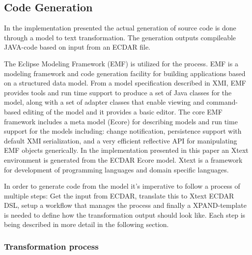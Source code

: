 \subsection{Code Generation}
\label{implementation-code-generation}

In the implementation presented the actual generation of source code is done
through a model to text transformation. The generation outputs compileable
JAVA-code based on input from an ECDAR file.

The Eclipse Modeling Framework (EMF) is utilized for the process. EMF is a
modeling framework and code generation facility for building applications based
on a structured data model. From a model specification described in XMI, EMF
provides tools and run time support to produce a set of Java classes for the
model, along with a set of adapter classes that enable viewing and command-based
editing of the model and it provides a basic editor.  The core EMF framework
includes a meta model (Ecore) for describing models and run time support for the
models including: change notification, persistence support with default XMI
serialization, and a very efficient reflective API for manipulating EMF objects
generically. In the implementation presented in this paper an Xtext environment
is generated from the ECDAR Ecore model. Xtext is a framework for development of
programming languages and domain specific languages.

In order to generate code from the model it's imperative to follow a process of
multiple steps: Get the input from ECDAR, translate this to Xtext ECDAR DSL,
setup a workflow that manages the process and finally a XPAND-template is needed
to define how the transformation output should look like. Each step is being
described in more detail in the following section.

\subsubsection{Transformation process}
\label{transformation-process}

